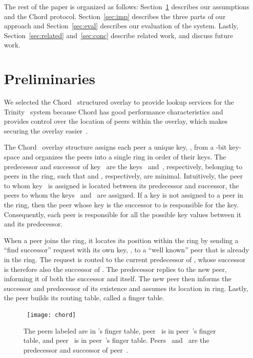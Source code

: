 \documentclass[11pt]{article}
\begin{document}
The rest of the paper is organized as follows: Section~\ref{sec:bg}
describes our assumptions and the Chord protocol.  Section~\ref{sec:imp}
describes the three parts of our approach and Section~\ref{sec:eval}
describes our evaluation of the system.  Lastly, Section~\ref{sec:related}
and~\ref{sec:conc} describe related work, and discuss future work.


\section{Preliminaries}\label{sec:bg}
We selected the Chord~\cite{StMoKaKaBa01} structured overlay to
provide lookup services for the Trinity~\cite{BrBr07} system because
Chord has good performance characteristics and provides control over 
the location of peers within the overlay, which makes securing the 
overlay easier~\cite{SiMo02,CaDrGaRoWa02}.  

The Chord~\cite{StMoKaKaBa01} overlay structure assigns each peer
a unique key, , from a -bit key-space and organizes the
peers into a single ring in order of their keys.  The predecessor
and successor of key~ are the keys~ and~, respectively,
belonging to peers in the ring, such that 
and , respectively, are minimal.  Intuitively,
the peer to whom key~ is assigned is located between its predecessor
and successor, the peers to whom the keys~ and~ are
assigned.  If a key  is not assigned to a peer in the ring, then
the peer whose key is the successor to  is responsible for the
key.  Consequently, each peer is responsible for all the possible
key values between it and its predecessor.

When a peer joins the ring, it locates its position within the ring
by sending a ``find successor'' request with its own key, , to
a ``well known'' peer that is already in the ring.  The request is
routed to the current predecessor of , whose successor is therefore
also the successor of .  The predecessor replies to the new
peer, informing it of both the successor and itself.  The new peer
then informs the successor and predecessor of its existence and assumes
its location in ring.  Lastly, the peer builds its routing table,
called a finger table.

\begin{figure*}[htb]
  \begin{center}
  \ \texttt{[image: chord]}\
  \caption{The peers labeled  are in 's finger table, peer~ is 
           in peer~'s finger table, and peer~ is in peer~'s 
           finger table.  Peers~ and~ are the predecessor and 
           successor of peer~.  \label{fig:chord}}
  \end{center}
\end{figure*}
\end{document}
